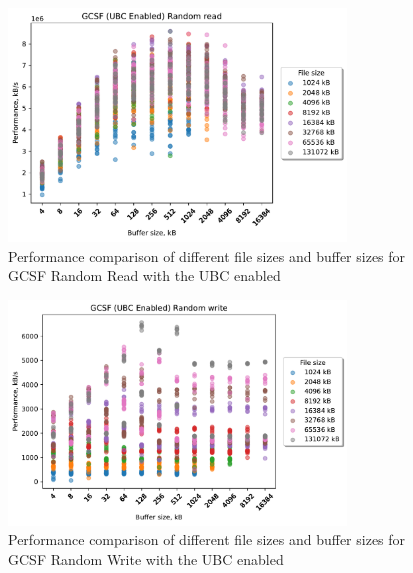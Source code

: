 \begin{figure}[!htb]
	\label{fig:bench_gcsf_no_ubc_scatter_rnd_read}
	\begin{center}
		\includegraphics[width=0.8\textwidth]{figures.nosync/benchmarking/GCSF/scatter-UBC Enabled-Random read.pdf}
	\end{center}
	\caption[Comparison of Random Read performance for file size and buffer size for GCSF with the UBC disabled]{Performance comparison of different file sizes and buffer sizes for GCSF Random Read with the UBC enabled}
\end{figure}
\begin{figure}[!htb]
	\label{fig:bench_gcsf_no_ubc_scatter_rnd_write}
	\begin{center}
		\includegraphics[width=0.8\textwidth]{figures.nosync/benchmarking/GCSF/scatter-UBC Enabled-Random write.pdf}
	\end{center}
	\caption[Comparison of Random Write performance for file size and buffer size for GCSF with the UBC disabled]{Performance comparison of different file sizes and buffer sizes for GCSF Random Write with the UBC enabled}
\end{figure}
\clearpage



